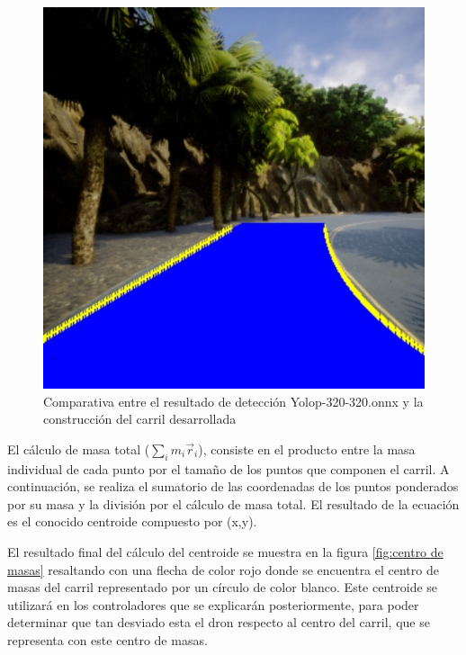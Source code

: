\begin{figure}[H]
\begin{minipage}[t]{0.2\textwidth}
  \end{minipage}
  \hfill
  \begin{minipage}[t]{0.2\textwidth}
      \centering
      \includegraphics[width=\textwidth]{figs/Diseño/Regresiones/interpolación4.jpg}
  \end{minipage}
  \caption{Comparativa entre el resultado de detección Yolop-320-320.onnx y la construcción del carril desarrollada}
  \label{comparativa-interpolacion}
  \vspace{-1.5em}
\end{figure}
  El cálculo de masa total ($\sum_{i}m_{i} \vec{r}_{i}$), consiste en el producto entre la masa individual de cada punto por el tamaño de los puntos que componen el carril. A continuación, 
  se realiza el sumatorio de las coordenadas de los puntos ponderados por su masa y la división por el cálculo de masa total. El resultado de la ecuación es el conocido centroide 
  compuesto por (x,y).
  
  El resultado final del cálculo del centroide se muestra en la figura \ref{fig:centro de masas} resaltando con una flecha de color rojo donde se encuentra
  el centro de masas del carril representado por un círculo de color blanco. Este centroide se utilizará en los controladores que se explicarán
  posteriormente, para poder determinar que tan desviado esta el dron respecto al centro del carril, que se representa con este centro de masas.

